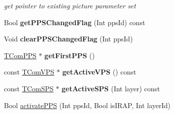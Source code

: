\begin{DoxyCompactItemize}
\begin{DoxyCompactList}\small\item\em get pointer to existing picture parameter set \end{DoxyCompactList}\item 
\mbox{\label{class_parameter_set_manager_a014e130704936159146686b7cb63d7d6}} 
Bool {\bfseries get\+P\+P\+S\+Changed\+Flag} (Int pps\+Id) const
\item 
\mbox{\label{class_parameter_set_manager_a2136d3694effb530bac584e037c64724}} 
Void {\bfseries clear\+P\+P\+S\+Changed\+Flag} (Int pps\+Id)
\item 
\mbox{\label{class_parameter_set_manager_ae1ef34e44082f3183ac8356702f50d52}} 
\hyperlink{class_t_com_p_p_s}{T\+Com\+P\+PS} $\ast$ {\bfseries get\+First\+P\+PS} ()
\item 
\mbox{\label{class_parameter_set_manager_af65dcd202bf56e0c6bd1e2038ce7ef11}} 
const \hyperlink{class_t_com_v_p_s}{T\+Com\+V\+PS} $\ast$ {\bfseries get\+Active\+V\+PS} () const
\item 
\mbox{\label{class_parameter_set_manager_a4f8c560b94e0735ea8c1c97b15660745}} 
const \hyperlink{class_t_com_s_p_s}{T\+Com\+S\+PS} $\ast$ {\bfseries get\+Active\+S\+PS} (Int layer) const
\end{DoxyCompactItemize}
{\bf }\par
\begin{DoxyCompactItemize}
\item 
Bool \hyperlink{class_parameter_set_manager_a7a8bef7b80abb0b30832c5d4d4d1939c}{activate\+P\+PS} (Int pps\+Id, Bool is\+I\+R\+AP, Int layer\+Id)
\end{DoxyCompactItemize}

